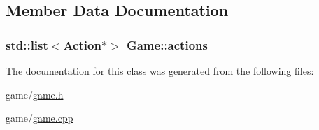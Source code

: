 \subsection{Member Data Documentation}
\hypertarget{class_game_a8e61c60693aa39b8a3deb5f3f277b43f}{
\subsubsection[{actions}]{\setlength{\rightskip}{0pt plus 5cm}std\-::list$<${\bf Action}$\ast$$>$ Game\-::actions}}\label{class_game_a8e61c60693aa39b8a3deb5f3f277b43f}


The documentation for this class was generated from the following files\-:\begin{DoxyCompactItemize}
\item 
game/\hyperlink{game_8h}{game.\-h}\item 
game/\hyperlink{game_8cpp}{game.\-cpp}\end{DoxyCompactItemize}
